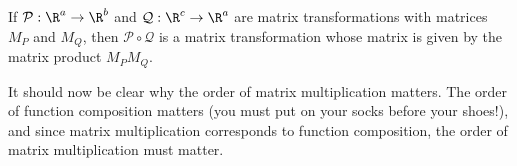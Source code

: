 \begin{theorem}
	If $\mathcal P:\R^a\to\R^b$ and $\mathcal Q:\R^c\to \R^a$ are matrix transformations with matrices 
	$M_P$ and $M_Q$, then $\mathcal P\circ \mathcal Q$ is a matrix transformation whose matrix is given
	by the matrix product $M_PM_Q$.
\end{theorem}

It should now be clear why the order of matrix multiplication matters. The order of function composition
matters (you must put on your socks before your shoes!), and since matrix multiplication corresponds
to function composition, the order of matrix multiplication must matter.
